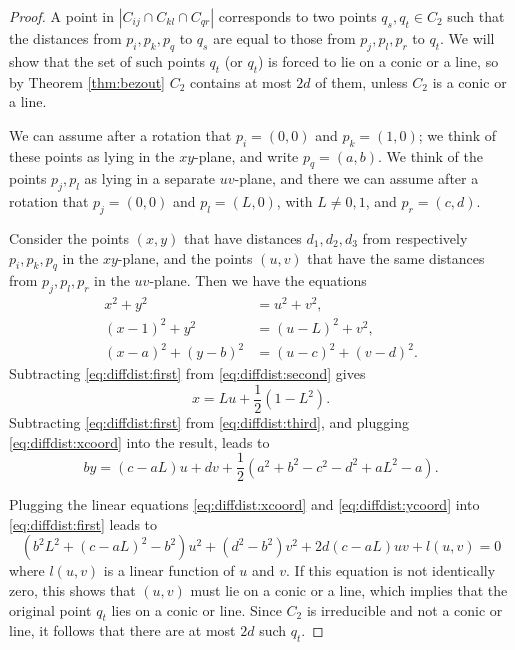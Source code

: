 \documentclass[12pt]{article}
\begin{document}
\begin{proof}
 A point in $|C_{ij}\cap C_{kl} \cap C_{qr}|$ corresponds 
 to two points $q_s,q_t\in C_2$
 such that the distances from $p_i,p_k,p_q$ to $q_s$ are equal 
 to those from $p_j, p_l,p_r$ to $q_t$.
 We will show that the set of such points $q_t$ (or $q_t$) 
 is forced to lie on a conic or a line, 
 so by Theorem \ref{thm:bezout} $C_2$ contains at most $2d$ of them, 
 unless $C_2$ is a conic or a line.
 
 We can assume after a rotation that $p_i = (0,0)$ and $p_k = (1,0)$; we think of these points as lying in the $xy$-plane,
 and write $p_q = (a,b)$.
 We think of the points $p_j,p_l$ as lying in a separate $uv$-plane, 
 and there we can assume after a rotation that $p_j = (0,0)$ and $p_l = (L,0)$, with $L\neq 0,1$,
 and $p_r = (c,d)$.
 
 Consider the points $(x,y)$ that have distances $d_1,d_2,d_3$ from respectively $p_i,p_k,p_q$ in the $xy$-plane, 
 and the points $(u,v)$ that have the same distances from $p_j, p_l,p_r$ in the $uv$-plane.
 Then we have the equations
 \begin{align}
  \label{eq:diffdist:first} x^2+y^2 & = u^2 + v^2, \\
  \label{eq:diffdist:second}(x-1)^2 + y^2  & = (u-L)^2 + v^2, \\
  \label{eq:diffdist:third}(x-a)^2 + (y-b)^2 & = (u-c)^2 + (v-d)^2.
 \end{align}
 Subtracting \eqref{eq:diffdist:first} from \eqref{eq:diffdist:second} gives 
 \begin{equation}\label{eq:diffdist:xcoord} 
  x = Lu + \frac{1}{2}(1-L^2).
 \end{equation}
 Subtracting \eqref{eq:diffdist:first} from \eqref{eq:diffdist:third}, 
 and plugging \eqref{eq:diffdist:xcoord} into the result, leads to
 \begin{equation}\label{eq:diffdist:ycoord}
  by = (c - aL) u +dv + \frac{1}{2}(a^2+b^2 -c^2 - d^2 +aL^2 -a).
 \end{equation}
 
 
 
 Plugging the linear equations \eqref{eq:diffdist:xcoord} and \eqref{eq:diffdist:ycoord} 
 into \eqref{eq:diffdist:first} leads to
 \begin{equation}\label{eq:diffdist:quad}
  (b^2L^2 + (c-aL)^2 -b ^2) u^2 + (d^2-b^2) v^2 + 2d(c-aL)uv + l(u,v) = 0
 \end{equation}
 where $l(u,v)$ is a linear function of $u$ and $v$. 
 If this equation is not identically zero,
 this shows that $(u,v)$ must lie on a conic or a line,
 which implies that the original point $q_t$ lies on a conic or line.
 Since $C_2$ is irreducible and not a conic or line,
 it follows that there are at most $2d$ such $q_t$.
 

\end{proof}
\end{document}
